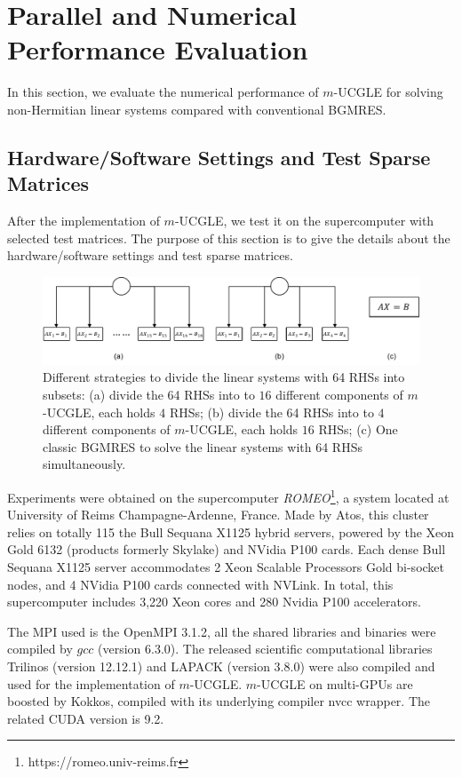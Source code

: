 \section{Parallel and Numerical Performance Evaluation}

In this section, we evaluate the numerical performance of $m$-UCGLE for solving non-Hermitian linear systems compared with conventional BGMRES.

\subsection{Hardware/Software Settings and Test Sparse Matrices}\label{hardware}

After the implementation of $m$-UCGLE, we test it on the supercomputer with selected test matrices. The purpose of this section is to give the details about the hardware/software settings and test sparse matrices.

\begin{figure}[htbp]
	\centering
	\includegraphics[width=6.4in]{fig/alloc.pdf}
	\caption{Different strategies to divide the linear systems with 64 RHSs into subsets: (a) divide the 64 RHSs into to $16$ different components of $m$-UCGLE, each holds $4$ RHSs; (b) divide the 64 RHSs into to $4$ different components of $m$-UCGLE, each holds $16$ RHSs; (c) One classic BGMRES to solve the linear systems with 64 RHSs simultaneously.}
	\label{fig:alloc}
\end{figure}

Experiments were obtained on the supercomputer \textit{ROMEO}\footnote{https://romeo.univ-reims.fr}, a system located at University of Reims Champagne-Ardenne, France. Made by Atos, this cluster relies on totally 115 the Bull Sequana X1125 hybrid servers, powered by the Xeon Gold 6132 (products formerly Skylake) and NVidia P100 cards. Each dense Bull Sequana X1125 server accommodates 2 Xeon Scalable Processors Gold bi-socket nodes, and 4 NVidia P100 cards connected with NVLink. In total, this supercomputer includes 3,220 Xeon cores and 280 Nvidia P100 accelerators.

The MPI used is the OpenMPI 3.1.2, all the shared libraries and binaries were compiled by $gcc$ (version 6.3.0). The released scientific computational libraries Trilinos (version 12.12.1) and LAPACK (version 3.8.0) were also compiled and used for the implementation of $m$-UCGLE. $m$-UCGLE on multi-GPUs are boosted by Kokkos, compiled with its underlying compiler nvcc wrapper. The related CUDA version is 9.2.

